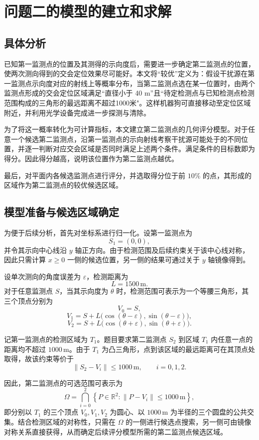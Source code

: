 \documentclass[withoutpreface,bwprint]{cumcmthesis}
\begin{document}
\section{问题二的模型的建立和求解}
\subsection{具体分析}
已知第一监测点的位置及其测得的示向度后，需要进一步确定第二监测点的位置，使两次测向得到的交会定位效果尽可能好。本文将“较优”定义为：假设干扰源在第一监测点示向度对应的射线上等概率分布，当第二监测点选在某一位置时，由两个监测点形成的交会定位区域满足“直径小于 40 m”且“待定检测点与已知检测点检测范围构成的三角形的最远距离不超过1000米"。这样机器狗可直接移动至定位区域附近，并利用光学设备完成进一步探测与清除。

为了将这一概率转化为可计算指标，本文建立第二监测点的几何评分模型。对于任意一个候选第二监测点，沿第一监测点的示向射线考察干扰源可能处于的不同位置，并逐一判断对应交会区域是否同时满足上述两个条件。满足条件的目标数即为得分。因此得分越高，说明该位置作为第二监测点越优。

最后，对平面内各候选监测点进行评分，并选取得分位于前 \(10\%\) 的点，其形成的区域作为第二监测点的较优候选区域。

\subsection{模型准备与候选区域确定}
为便于后续分析，首先对坐标系进行归一化。设第一监测点为
\[
S_1=(0,0),
\]
并令其示向中心线沿 $y$ 轴正方向。由于检测范围及后续约束关于该中心线对称，因此只需计算 $x\geq 0$ 一侧的候选位置，另一侧的结果可通过关于 $y$ 轴镜像得到。

设单次测向的角度误差为 $\varepsilon$，检测距离为
\[
L=1500\,\mathrm{m}.
\]
对于任意监测点 $S$，当其示向度为 $\theta$ 时，检测范围可表示为一个等腰三角形，其三个顶点分别为
\[
V_0=S,
\]
\[
V_1=S+L
\bigl(
\cos(\theta-\varepsilon),
\sin(\theta-\varepsilon)
\bigr),
\]
\[
V_2=S+L
\bigl(
\cos(\theta+\varepsilon),
\sin(\theta+\varepsilon)
\bigr).
\]

记第一监测点的检测区域为 $T_1$。题目要求第二监测点 $S_2$ 到区域 $T_1$ 内任意一点的距离均不超过 $1000\,\mathrm{m}$。由于 $T_1$ 为凸三角形，点到该区域的最远距离可在其顶点处取得，故该约束等价于
\[
\|S_2-V_i\|\leq 1000\,\mathrm{m},
\qquad i=0,1,2.
\]

因此，第二监测点的可选范围可表示为
\[
\Omega
=
\bigcap_{i=0}^{2}
\left\{
P\in\mathbb{R}^2:
\|P-V_i\|\leq 1000\,\mathrm{m}
\right\},
\]
即分别以 $T_1$ 的三个顶点 $V_0,V_1,V_2$ 为圆心、以 $1000\,\mathrm{m}$ 为半径的三个圆盘的公共交集。结合检测区域的对称性，只需在 $\Omega$ 的一侧进行候选点搜索，另一侧可由镜像对称关系直接获得，从而确定后续评分模型所需的第二监测点候选区域。
\end{document}
